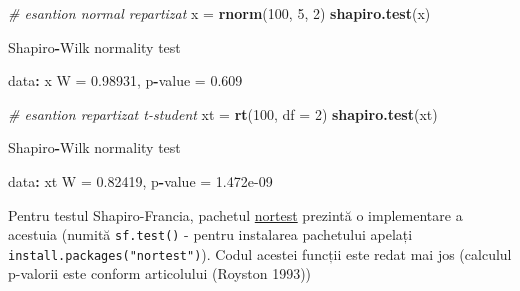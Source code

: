 \documentclass[]{article}
\newenvironment{Shaded}{\begin{snugshade}}{\end{snugshade}}
\newcommand{\KeywordTok}[1]{\textcolor[rgb]{0.13,0.29,0.53}{\textbf{#1}}}
\newcommand{\DataTypeTok}[1]{\textcolor[rgb]{0.13,0.29,0.53}{#1}}
\newcommand{\DecValTok}[1]{\textcolor[rgb]{0.00,0.00,0.81}{#1}}
\newcommand{\FloatTok}[1]{\textcolor[rgb]{0.00,0.00,0.81}{#1}}
\newcommand{\StringTok}[1]{\textcolor[rgb]{0.31,0.60,0.02}{#1}}
\newcommand{\CommentTok}[1]{\textcolor[rgb]{0.56,0.35,0.01}{\textit{#1}}}
\newcommand{\OperatorTok}[1]{\textcolor[rgb]{0.81,0.36,0.00}{\textbf{#1}}}
\newcommand{\NormalTok}[1]{#1}
\begin{document}
\begin{Shaded}
\begin{Highlighting}[]
\CommentTok{# esantion normal repartizat }
\NormalTok{x =}\StringTok{ }\KeywordTok{rnorm}\NormalTok{(}\DecValTok{100}\NormalTok{, }\DecValTok{5}\NormalTok{, }\DecValTok{2}\NormalTok{)}
\KeywordTok{shapiro.test}\NormalTok{(x)}

\NormalTok{    Shapiro}\OperatorTok{-}\NormalTok{Wilk normality test}

\NormalTok{data}\OperatorTok{:}\StringTok{  }\NormalTok{x}
\NormalTok{W =}\StringTok{ }\FloatTok{0.98931}\NormalTok{, p}\OperatorTok{-}\NormalTok{value =}\StringTok{ }\FloatTok{0.609}

\CommentTok{# esantion repartizat t-student}
\NormalTok{xt =}\StringTok{ }\KeywordTok{rt}\NormalTok{(}\DecValTok{100}\NormalTok{, }\DataTypeTok{df =} \DecValTok{2}\NormalTok{)}
\KeywordTok{shapiro.test}\NormalTok{(xt)}

\NormalTok{    Shapiro}\OperatorTok{-}\NormalTok{Wilk normality test}

\NormalTok{data}\OperatorTok{:}\StringTok{  }\NormalTok{xt}
\NormalTok{W =}\StringTok{ }\FloatTok{0.82419}\NormalTok{, p}\OperatorTok{-}\NormalTok{value =}\StringTok{ }\FloatTok{1.472e-09}
\end{Highlighting}
\end{Shaded}

Pentru testul Shapiro-Francia, pachetul
\href{https://cran.r-project.org/web/packages/nortest/}{nortest}
prezintă o implementare a acestuia (numită \texttt{sf.test()} - pentru
instalarea pachetului apelați \texttt{install.packages("nortest")}).
Codul acestei funcții este redat mai jos (calculul p-valorii este
conform articolului (Royston 1993))
\end{document}

